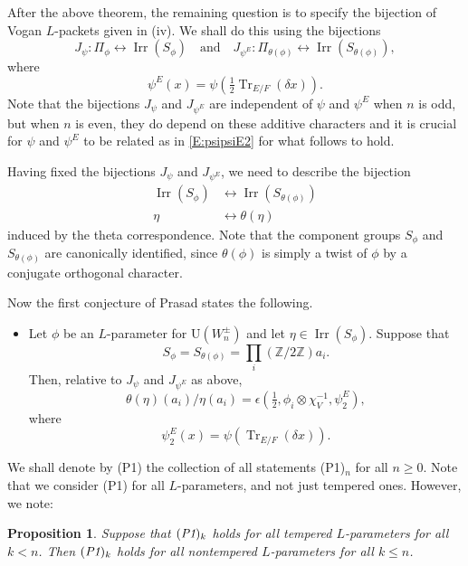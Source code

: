 \documentclass[11pt]{amsart}
\numberwithin{equation}{section}
\theoremstyle{plain}
\newtheorem{prop}[thm]{Proposition}
\theoremstyle{definition}
\theoremstyle{remark}
\def\Irr{\operatorname{Irr}}
\def\Tr{\operatorname{Tr}}
\def\U{\mathrm{U}}
\def\ZZ{\mathbb{Z}}
\begin{document}
After the above theorem, the remaining question is to specify the bijection of Vogan $L$-packets given in (iv).
We shall do this using the bijections
\[  J_{\psi}:  \Pi_{\phi} \longleftrightarrow \Irr(S_{\phi})   \quad \text{and} \quad J_{\psi^E}:  \Pi_{\theta(\phi)} \longleftrightarrow \Irr(S_{\theta(\phi)}), \]
where
\begin{equation}  \label{E:psipsiE2}
  \psi^E(x)  = \psi(\tfrac{1}{2} \Tr_{E/F}(\delta x)). \end{equation}
Note that the bijections $J_{\psi}$ and $J_{\psi^E}$ are independent of $\psi$ and $\psi^E$ when $n$ is odd, but when $n$ is even, they do depend on these additive characters and it is crucial for $\psi$ and $\psi^E$ to be related as in \eqref{E:psipsiE2} for what follows to hold. 

Having fixed the bijections $J_{\psi}$ and $J_{\psi^E}$, we need to describe the bijection
\begin{align*}
 \Irr(S_{\phi}) & \longleftrightarrow \Irr(S_{\theta(\phi)}) \\
 \eta & \longleftrightarrow \theta(\eta)
\end{align*}
induced by the theta correspondence.
Note that the component groups $S_{\phi}$ and $S_{\theta(\phi)}$ are canonically identified, since $\theta(\phi)$ is simply a twist of $\phi$ by a conjugate orthogonal character. 

Now the first conjecture of Prasad states the following.

\begin{itemize}

\item[(P1)$_n$]
Let $\phi$ be an $L$-parameter for $\U(W_n^\pm)$ and let $\eta \in \Irr(S_\phi)$. Suppose that
\[  S_{\phi} = S_{\theta(\phi)} = \prod_i (\ZZ /2\ZZ) a_i. \]
Then, relative to $J_{\psi}$ and $J_{\psi^E}$ as above, 
\[  \theta(\eta)(a_i) / \eta(a_i)  = \epsilon(\tfrac{1}{2}, \phi_i \otimes  \chi_V^{-1},  \psi^E_2), \]
where 
\[  \psi^E_2(x)  = \psi(\Tr_{E/F}(\delta x)).  \]
\end{itemize}

We shall denote by (P1) the collection of all statements (P1)$_n$ for all $n \ge 0$. Note that we consider (P1) for all $L$-parameters, and not just tempered ones. However, we note:

\begin{prop}  \label{P:P1nt}
Suppose that $(\emph{P1})_k$ holds for all tempered $L$-parameters for all $k < n$. Then $(\emph{P1})_k$ holds for all nontempered $L$-parameters for all $k \le n$.
\end{prop}
\end{document}
